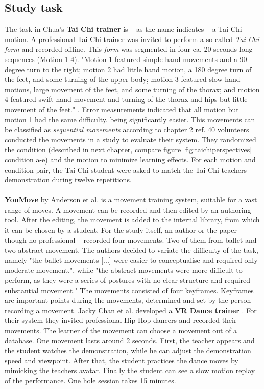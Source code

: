 \subsection{Study task}
The task in Chua's \cite{Chua} \textbf{Tai Chi trainer} is \--- as the name indicates \--- a Tai Chi motion. A professional Tai Chi trainer was invited to perform a so called \textit{Tai Chi form} and recorded offline. This \textit{form} was segmented in four ca. 20 seconds long sequences (Motion 1-4). "Motion 1 featured simple hand movements and a 90 degree turn to the right; motion 2 had little hand motion, a 180 degree turn of the feet, and some turning of the upper body; motion 3 featured slow hand motions, large movement of the feet, and some turning of the thorax; and motion 4 featured swift hand movement and turning of the thorax and hips but little movement of the feet." \cite{Chua}. Error measurements indicated that all motion but motion 1 had the same difficulty, being significantly easier. This movements can be classified as \textit{sequential movements} according to chapter 2 \todo ref. 40 volunteers conducted the movements in a study to evaluate their system. They randomized the condition (described in next chapter, compare figure \ref{fig:taichiperspectives} condition a-e) and the motion to minimize learning effects. For each motion and condition pair, the Tai Chi student were asked to match the Tai Chi teachers demonstration during twelve repetitions.\\ \\
\textbf{YouMove} by Anderson et al. \cite{Anderson2013} is a movement training system, suitable for a vast range of moves. A movement can be recorded and then edited by an authoring tool. After the editing, the movement is added to the internal library, from which it can be chosen by a student. For the study itself, an author or the paper \--- though no professional \--- recorded four movements. Two of them from ballet and two abstract movement. The authors decided to variate the difficulty of the task, namely "the ballet movements [...] were easier to conceptualise and required only moderate movement.", while "the abstract movements were more difficult to perform, as they were a series of postures with no clear structure and required substantial movement." The movements consisted of four keyframes. Keyframes are important points during the movements, determined and set by the person recording a movement.
Jacky Chan et al. developed a \textbf{VR Dance trainer} \cite{Chan2011}. For their system they invited professional Hip-Hop dancers and recorded their movements. The learner of the movement can choose a movement out of a database. One movement lasts around 2 seconds. First, the teacher appears and the student watches the demonstration, while he can adjust the demonstration speed and viewpoint. After that, the student practices the dance moves by mimicking the teachers avatar. Finally the student can see a slow motion replay of the performance. One hole session takes 15 minutes.
